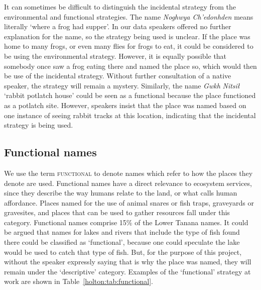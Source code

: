 It can sometimes be difficult to distinguish the incidental strategy from the environmental and functional strategies. The name \textit{Noghwya Ch’edonhden} means literally ‘where a frog had supper’. In our data speakers offered no further explanation for the name, so the strategy being used is unclear. If the place was home to many frogs, or even many flies for frogs to eat, it could be considered to be using the environmental strategy. However, it is equally possible that somebody once saw a frog eating there and named the place so, which would then be use of the incidental strategy. Without further consultation of a native speaker, the strategy will remain a mystery. Similarly, the name \textit{Gwkh} \textit{Nitsił} ‘rabbit potlatch house’ could be seen as a functional because the place functioned as a potlatch site. However, speakers insist that the place was named based on one instance of seeing rabbit tracks at this location, indicating that the incidental strategy is being used.

\subsection{Functional names}
We use the term \textsc{functional} to denote names which refer to how the places they denote are used. Functional names have a direct relevance to ecosystem services, since they describe the way humans relate to the land, or what \citet{levinson2008} calls human affordance. Places named for the use of animal snares or fish traps, graveyards or gravesites, and places that can be used to gather resources fall under this category. Functional names comprise 15\% of the Lower Tanana names. It could be argued that names for lakes and rivers that include the type of fish found there could be classified as ‘functional’, because one could speculate the lake would be used to catch that type of fish. But, for the purpose of this project, without the speaker expressly saying that is why the place was named, they will remain under the ‘descriptive’ category. Examples of the ‘functional’ strategy at work are shown in Table~\ref{holton:tab:functional}.


